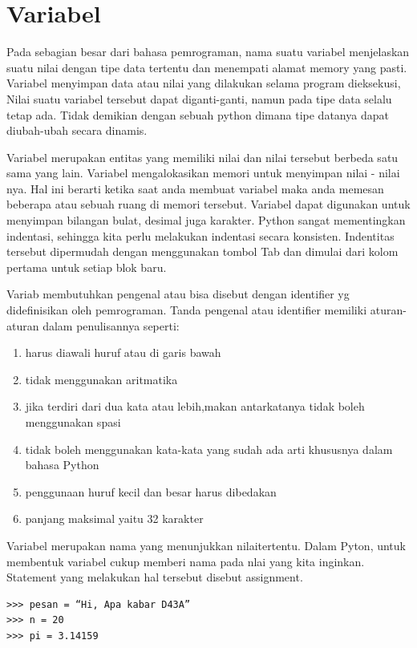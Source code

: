 
\section{Variabel}
Pada sebagian besar dari bahasa pemrograman, nama suatu variabel
menjelaskan suatu nilai dengan tipe data tertentu 
dan menempati alamat memory yang pasti.
Variabel menyimpan data atau nilai yang dilakukan selama program dieksekusi,
Nilai suatu variabel tersebut dapat diganti-ganti, namun pada tipe data selalu tetap ada.
Tidak demikian dengan sebuah python dimana tipe datanya dapat diubah-ubah
secara dinamis\cite{suparno2013komputasi}.

Variabel merupakan entitas yang memiliki nilai dan nilai tersebut berbeda satu sama yang lain. Variabel mengalokasikan memori untuk menyimpan nilai - nilai nya.
Hal ini berarti ketika saat anda membuat variabel maka anda memesan beberapa atau sebuah ruang di memori tersebut. 
Variabel dapat digunakan untuk menyimpan bilangan bulat, desimal juga karakter.
Python sangat mementingkan indentasi, sehingga kita perlu melakukan indentasi secara konsisten. 
Indentitas tersebut dipermudah dengan menggunakan tombol Tab dan dimulai dari kolom pertama untuk setiap blok baru.

Variab membutuhkan pengenal atau bisa disebut dengan identifier yg didefinisikan oleh pemrograman. Tanda pengenal atau identifier memiliki aturan-aturan dalam penulisannya seperti:
\begin{enumerate}
\item
harus diawali huruf atau di garis bawah
\item
tidak menggunakan aritmatika
\item
jika terdiri dari dua kata atau lebih,makan antarkatanya tidak boleh menggunakan spasi
\item
tidak boleh menggunakan kata-kata yang sudah ada arti khususnya dalam bahasa Python
\item
penggunaan huruf kecil dan besar harus dibedakan
\item
panjang maksimal yaitu 32 karakter
\end{enumerate}

Variabel merupakan nama yang menunjukkan nilaitertentu. Dalam Pyton, untuk membentuk variabel cukup memberi nama pada nlai yang kita inginkan. Statement yang melakukan hal tersebut disebut assignment.
\begin{verbatim}
>>> pesan = “Hi, Apa kabar D43A”
>>> n = 20
>>> pi = 3.14159
\end{verbatim}

